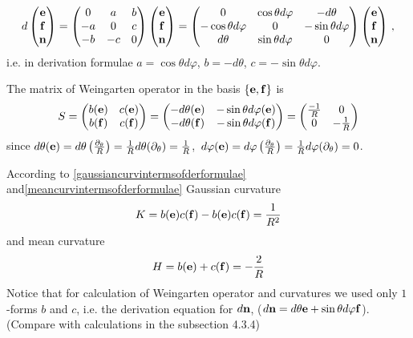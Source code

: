 \documentclass[12pt]{article}
\theoremstyle{theorem}
\numberwithin{equation}{section}
\begin{document}
   \begin{equation}\label{derivationformulaefor cylinder}
                    d\begin{pmatrix}
                    {\bf e}\cr{\bf f}\cr{\bf n}\cr
                    \end{pmatrix}=
                    \begin{pmatrix}
                    0&a&b\cr -a&0&c\cr -b&-c&0\cr
                    \end{pmatrix}
                 \begin{pmatrix}
                    {\bf e}\cr{\bf f}\cr{\bf n}\cr
                    \end{pmatrix}=
                     \begin{pmatrix}
                    0&\cos\theta d\varphi& -d\theta\cr
                    -\cos\theta d\varphi&0&-\sin\theta d\varphi\cr
                     d\theta&\sin\theta d\varphi&0\cr
                    \end{pmatrix}
                 \begin{pmatrix}
                    {\bf e}\cr{\bf f}\cr{\bf n}\cr
                    \end{pmatrix}\,,
                   \end{equation}
  i.e. in derivation formulae $a=\cos\theta d\varphi$,
  $b=-d\theta$, $c=-\sin\theta d\varphi$.

  The matrix of Weingarten operator in the basis  $\{{\bf e},{\bf f}\}$ is
             $$
     S=
\begin{pmatrix}
b({\bf e})  &c({\bf e})\cr
b({\bf f})  &c({\bf f})\cr
\end{pmatrix}=
\begin{pmatrix}
-d\theta ({\bf e}) &-\sin\theta d\varphi ({\bf e})\cr
-d\theta ({\bf f})  &-\sin\theta d\varphi({\bf f})\cr
\end{pmatrix}=
\begin{pmatrix}
{-1\over R}  &0\cr
0  &-{1\over R}\cr
\end{pmatrix}
       $$
       since $d\theta({\bf e})=d\theta\left({\partial_\theta\over R}\right)={1\over R}d\theta(\partial_\theta)={1\over R}$,
       $\,d\varphi({\bf e})=d\varphi\left({\partial_\theta\over R}\right)={1\over R}d\varphi(\partial_\theta)=0$.

    According to  \eqref{gaussiancurvintermsofderformulae}  and\eqref{meancurvintermsofderformulae}
                Gaussian curvature $$
                K=b({\bf e})c({\bf f})-b({\bf e})c({\bf f})={1\over R^2}
                                    $$
                                    and
                mean curvature
                 $$
    H=b({\bf e})+c({\bf f})=-{2\over R}
                 $$
    Notice that for calculation of Weingarten operator and curvatures we used only
    $1$-forms $b$ and $c$, i.e. the derivation equation for $d{\bf n}$, ($d{\bf n}=d\theta {\bf e}+\sin\theta d\varphi {\bf f}$).
  (Compare with calculations in the subsection 4.3.4)
\end{document}
